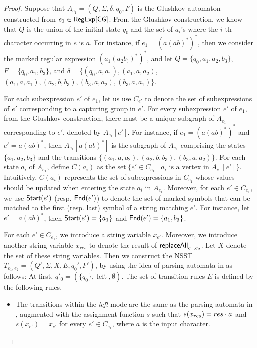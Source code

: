\documentclass[sigplan,review,anonymous]{acmart}\settopmatter{printfolios=true,printccs=false,printacmref=false}
\newcommand{\tmop}[1]{\ensuremath{\operatorname{#1}}}
\newcommand\NSST{{\sf NSST}}
\newcommand\ssym{{\sf Start}}
\newcommand\esym{{\sf End}}
\begin{document}
\begin{proof}
Suppose that $A_{e_1} =(Q, \Sigma,  \delta, q_0, F)$ is the Glushkov automaton \cite{Gluskov61} constructed from $e_1 \in {\sf RegExp}[\sf CG]$. From the Glushkov
construction, we know that $Q$ is the union of the initial state $q_0$ and the set of $a_i$'s where the $i$-th character occurring in $e$ is $a$. For instance, if $e_1 = (a (ab)^*)^*$, then we consider the marked regular expression $(a_1 (a_2 b_3)^*)^*$, and let $Q = \{q_0, a_1, a_2, b_3\}$, $F = \{q_0, a_1, b_3\}$, and $\delta = \{(q_0, a, a_1), (a_1, a, a_2)$, $(a_1, a, a_1), (a_2, b, b_3), (b_3, a, a_2), (b_3, a, a_1)\}$. 

For each subexpression $e'$ of $e_1$, let us use $C_{e'}$ to denote the set of subexpressions of $e'$ corresponding to a capturing group in $e'$.
For every subexpression $e'$ of $e_1$, from the Glushkov construction,
there must be a unique subgraph of $A_{e_1}$ corresponding to $e'$, denoted by $A_{e_1}[e']$. For instance, if $e_1 = (a (ab)^*)^*$ and $e' = a(ab)^*$, then $A_{e_1}[a(ab)^*]$ is the subgraph of $A_{e_1}$ comprising the states $\{a_1, a_2, b_3\}$ and the transitions $\{(a_1, a, a_2), (a_2, b, b_3), (b_3, a, a_2)\}$.
For each state $a_i$ of $A_{e_1}$, define $C(a_i)$  as the set $\{ e' \in C_{e_1} \mid a_i \mbox{ is a vertex in }
A_{e_1}[e']\}$. Intuitively, $C(a_i)$ represents the set of subexpressions in $C_{e_1}$ whose values should be updated when entering the state $a_i$ in $A_{e_1}$. Moreover, for each $e' \in C_{e_1}$, we use $\ssym(e')$ (resp. $\esym(e')$) to denote the set of marked symbols that can be matched to the first  (resp. last) symbol of a string matching $e'$. For instance, let $e' = a(ab)^*$, then $\ssym(e') = \{a_1\}$ and $\esym(e') = \{a_1, b_3\}$. 

For each $e' \in C_{e_1}$, we introduce a string variable $x_{e'}$. Moreover, we introduce another string variable $x_{res}$ to denote the result of $\mathsf{replaceAll}_{e_1,e_2}$. Let $X$ denote the set of these string variables.
Then we construct the \NSST{} $T_{e_1,e_2} = (Q', \Sigma, X, E, q_0', F')$, by using the idea of parsing automata in \cite{CCH+18} as follows: At first, $q'_0= (\{ q_0
\}, \tmop{left}, \emptyset)$. The set of transition rules $E$ is defined by the following rules.
\begin{itemize}
  \item The transitions within the \emph{left} mode are the same as the
   parsing automata in \cite{CCH+18}, augmented with the assignment function $s$ such that $s(x_{res}) = res \cdot a$ and $s(x_{e'})=x_{e'}$ for
  every $e' \in C_{e_1}$, where $a$ is the input character.
  

\end{itemize}
\end{proof}
\end{document}
